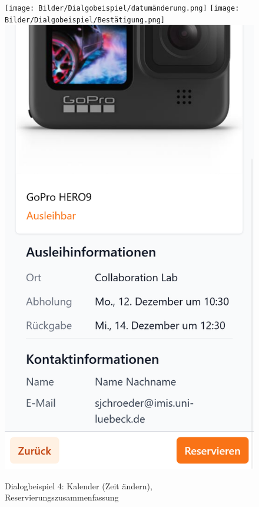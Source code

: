 \begin{figure}[p]
    \centering
    \texttt{[image: Bilder/Dialgobeispiel/datumänderung.png]}\hspace{1em}
    \texttt{[image: Bilder/Dialgobeispiel/Bestätigung.png]} \hspace{1em}
    \includegraphics[scale=0.17]{Bilder/Dialgobeispiel/Zsuammenfassung.png}
    \caption{Dialogbeispiel 4: Kalender (Zeit ändern), Reservierungszusammenfassung}\label{fig:geandert}
\end{figure}

